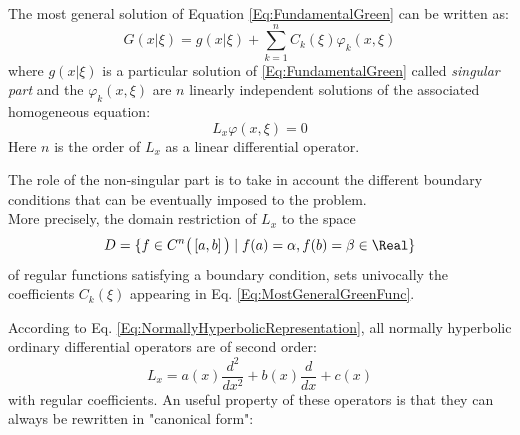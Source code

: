 \documentclass[Main]{subfiles}
\begin{document}
	\begin{remark}
		The most general solution of Equation 	\ref{Eq:FundamentalGreen} can be written as:
		\begin{equation}\label{Eq:MostGeneralGreenFunc}
		G( x \vert \xi) = g(x \vert \xi) + \sum_{k=1}^{n} C_k(\xi) \varphi_k(x,\xi)
		\end{equation}
		where $g(x \vert \xi)$ is a particular solution of \ref{Eq:FundamentalGreen} called \emph{singular part} and the $\varphi_k(x,\xi)$ are $n$ linearly independent solutions of the associated homogeneous equation:
		\begin{displaymath}
			L_x \varphi(x , \xi) = 0
		\end{displaymath}
		Here $n$ is the order of $L_x$ as a linear differential operator.

		\vspace{1mm}
		The role of the non-singular part is to take in account the different boundary conditions that can be eventually imposed to the problem.
		\\
		More precisely, the domain restriction of $L_x$ to the space
		\begin{displaymath}
			D = \{ f \in C^n \big( \left[a,b\right] \big) \; \vert \; f(a)= \alpha , f(b)=\beta \in \Real\}
		\end{displaymath}
		of regular functions satisfying a boundary condition,
		sets univocally the coefficients $C_k(\xi)$ appearing in Eq. \ref{Eq:MostGeneralGreenFunc}.
	\end{remark}

	According to Eq. \ref{Eq:NormallyHyperbolicRepresentation}, all normally hyperbolic ordinary differential operators are of second order:
	\begin{displaymath}
		L_x = a(x) \frac{d^2}{d x^2} + b(x) \frac{d}{d x} + c(x)
	\end{displaymath}
	with regular coefficients.
	An useful property of these operators is that they can always be rewritten in "canonical form":
\end{document}

